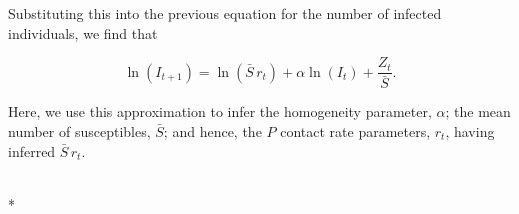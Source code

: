 \documentclass[letterpaper,10pt,english]{/Users/qcaudron/anaconda/lib/python2.7/site-packages/Sphinx-1.2b1-py2.7.egg/sphinx/texinputs/sphinxhowto}
\def\smaller{\fontsize{9.5pt}{9.5pt}\selectfont}
\begin{document}
Substituting this into the previous equation for the number of infected
individuals, we find that

\[
\ln(I_{t+1}) = \ln(\bar{S}\,r_t) + \alpha \ln(I_t) + \frac{Z_t}{\bar{S}}.
\]

Here, we use this approximation to infer the homogeneity parameter,
$\alpha$; the mean number of susceptibles, $\bar{S}$; and hence, the $P$
contact rate parameters, $r_t$, having inferred $\bar{S}\,r_t$.


    
        \vspace{6pt}
        \makebox[0.1\linewidth]{\smaller\hfill\tt\color{nbframe-in-prompt}In\hspace{4pt}{[}248{]}:\hspace{4pt}}\\*
        \vspace{-2.65\baselineskip}
\end{document}
